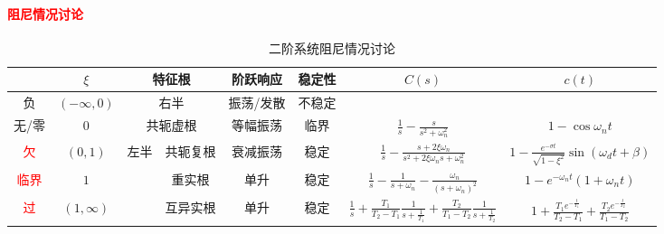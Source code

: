 \documentclass[
12pt, %
a4paper, 
oneside, %
]{scrartcl}
\begin{document}
\paragraph{\textcolor{red}{阻尼情况讨论}}
\begin{table}[H]
\centering
\footnotesize
\begin{tabular}{|c|c|c|c|c|c|c|c|}
\hline
 & $ \xi $ & \multicolumn{2}{c|}{特征根} & 阶跃响应 & 稳定性 & $ C(s) $ & $ c(t) $ \\
\hline
负 & $ (-\infty, 0) $ & \multicolumn{2}{c|}{右半} & 振荡/发散 & 不稳定 & \multicolumn{2}{c|}{} \\
\hline
无/零 & $ 0 $ & \multicolumn{2}{c|}{共轭虚根} & 等幅振荡 & 临界 & $ \frac{1}{s} - \frac{s}{s^2 + \omega_n^2} $ & $ 1 - \cos \omega_n t $ \\
\hline
\textcolor{red}{欠} & $ (0, 1) $ & \multirow{3}{*}{左半} & 共轭复根 & 衰减振荡 & 稳定 & $ \frac{1}{s} - \frac{s + 2\xi \omega_n}{s^2 + 2 \xi \omega_n s + \omega_n^2} $ & $ 1 - \frac{e^{-\sigma t}}{\sqrt{1 - \xi^2}}\sin(\omega_d t + \beta) $ \\
\cline{1-2} \cline{4-8}
\textcolor{red}{临界} & $ 1 $ & & 重实根 & 单升 & 稳定 & $ \frac{1}{s} - \frac{1}{s + \omega_n} - \frac{\omega_n}{(s + \omega_n)^2} $ & $ 1 - e^{-\omega_n t}(1 + \omega_n t) $ \\
\cline{1-2} \cline{4-8}
\textcolor{red}{过} & $ (1, \infty) $ & & 互异实根 & 单升 & 稳定 & $ \frac{1}{s} + \frac{T_1}{T_2 - T_1}\frac{1}{s + \frac{1}{T_1}} + \frac{T_2}{T_1 - T_2}\frac{1}{s + \frac{1}{T_2}} $ & $ 1 + \frac{T_1 e^{-\frac{t}{T_1}}}{T_2 - T_1} + \frac{T_2 e^{-\frac{t}{T_2}}}{T_1 - T_2} $ \\
\hline
\end{tabular}
\caption{二阶系统阻尼情况讨论}
\end{table}
\end{document}
